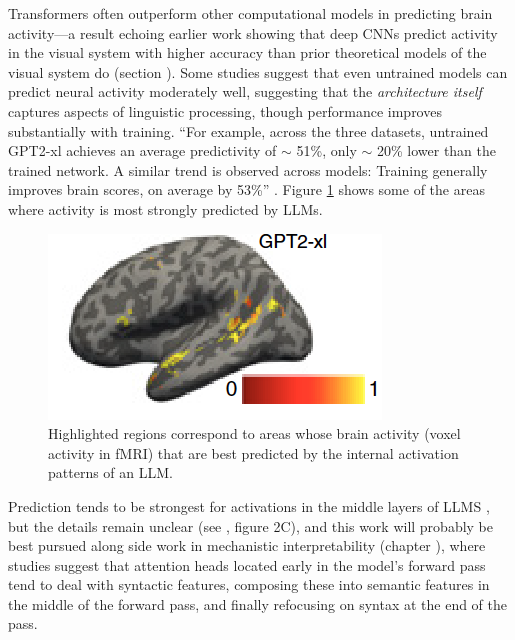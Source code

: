 Transformers often outperform other computational models in predicting brain activity---a result echoing earlier work showing that deep CNNs predict activity in the visual system with higher accuracy than prior theoretical models of the visual system do (section ). Some studies suggest that even untrained models can predict neural activity moderately well, suggesting that the \emph{architecture itself} captures aspects of linguistic processing, though performance improves substantially with training. ``For example, across the three datasets, untrained GPT2-xl achieves an average predictivity of $\sim$ 51\%, only $\sim$ 20\% lower than the trained network. A similar trend is observed across models: Training generally improves brain scores, on average by 53\%'' \cite{schrimpf2021neural}. Figure \ref{brainPredictionLLM} shows some of the areas where activity is most strongly predicted by LLMs.

\begin{figure}[h]
\centering
\includegraphics[scale=.9]{./images/brainPredictionsLLM.png}
\caption[From \cite{schrimpf2021neural}.]{Highlighted regions correspond to areas whose brain activity (voxel activity in fMRI) that are best predicted by the internal activation patterns of an LLM.}
\label{brainPredictionLLM}
\end{figure}

Prediction tends to be strongest for activations in the middle layers of LLMS \cite{caucheteux2022brains}, but the details remain unclear (see \cite{schrimpf2021neural}, figure 2C), and this work will probably be best pursued along side work in mechanistic interpretability  (chapter ), where studies suggest that attention heads located early in the model’s forward pass tend to deal with syntactic features, composing these into semantic features in the middle of the forward pass, and finally refocusing on syntax at the end of the pass.


